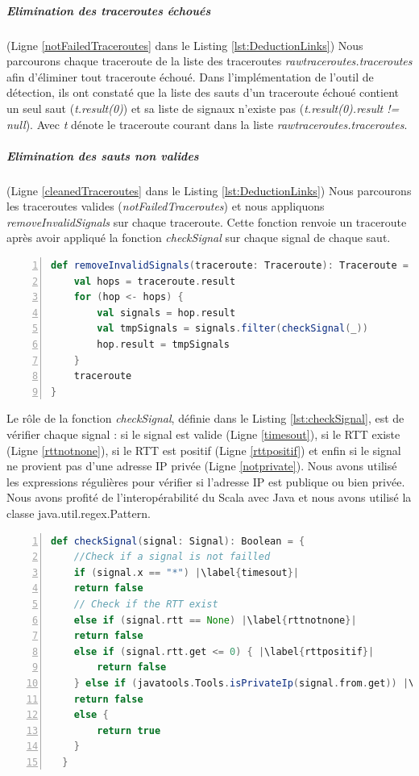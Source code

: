 \subparagraph{Elimination des traceroutes échoués} (Ligne \ref{notFailedTraceroutes} dans le Listing \ref{lst:DeductionLinks}) Nous parcourons chaque traceroute de la liste des traceroutes \textit{rawtraceroutes.traceroutes} afin d'éliminer tout traceroute échoué. Dans l'implémentation de l'outil de détection, ils ont constaté que la liste des sauts d'un traceroute échoué contient un seul saut (\textit{t.result(0)}) et sa liste de signaux n'existe pas (\textit{t.result(0).result != null}). Avec \textit{t} dénote le traceroute courant dans la liste \textit{rawtraceroutes.traceroutes}. 


\subparagraph{Elimination des sauts non valides} (Ligne \ref{cleanedTraceroutes} dans le Listing \ref{lst:DeductionLinks}) Nous parcourons les traceroutes valides (\textit{notFailedTraceroutes}) et nous appliquons  \textit{removeInvalidSignals} sur chaque traceroute. Cette fonction renvoie un traceroute après avoir appliqué la fonction \textit{checkSignal} sur chaque signal de chaque saut. 

\begin{lstlisting}[language=scala,firstnumber=1, caption={Définition de la méthode removeInvalidSignals},label={lst:removeInvalidSignals}, basicstyle = \footnotesize,escapechar=|,numbers=left,
stepnumber=1]
  def removeInvalidSignals(traceroute: Traceroute): Traceroute = {
	val hops = traceroute.result
	for (hop <- hops) {
		val signals = hop.result
		val tmpSignals = signals.filter(checkSignal(_))
		hop.result = tmpSignals
	}
	traceroute
}
\end{lstlisting}

Le rôle de la fonction \textit{checkSignal}, définie dans le Listing \ref{lst:checkSignal},  est de vérifier chaque signal : si le signal est valide (Ligne \ref{timesout}), si le RTT existe (Ligne \ref{rttnotnone}), si le RTT est positif  (Ligne \ref{rttpositif}) et enfin si le signal ne provient pas d'une adresse IP privée (Ligne \ref{notprivate}). Nous avons utilisé les expressions régulières pour vérifier si l'adresse IP est publique ou bien privée. Nous avons profité de l'interopérabilité du Scala avec Java et nous avons  utilisé la classe java.util.regex.Pattern.

\begin{lstlisting}[language=scala,firstnumber=1, caption={Définition de la méthode checkSignal},label={lst:checkSignal}, basicstyle = \footnotesize,escapechar=|,numbers=left,
stepnumber=1]
  def checkSignal(signal: Signal): Boolean = {
	//Check if a signal is not failled
	if (signal.x == "*") |\label{timesout}|
	return false
	// Check if the RTT exist
	else if (signal.rtt == None) |\label{rttnotnone}|
	return false
	else if (signal.rtt.get <= 0) { |\label{rttpositif}|
		return false
	} else if (javatools.Tools.isPrivateIp(signal.from.get)) |\label{notprivate}|
	return false
	else {
		return true
	}
  }
\end{lstlisting}

